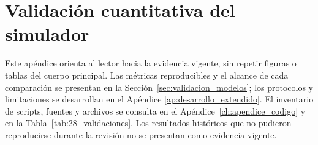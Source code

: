 \chapter{Validaci\'on cuantitativa del simulador}
\label{ap:validacion}

Este ap\'endice orienta al lector hacia la evidencia vigente, sin repetir
figuras o tablas del cuerpo principal. Las m\'etricas reproducibles y el
alcance de cada comparaci\'on se presentan en la Secci\'on~\ref{sec:validacion_modelos};
los protocolos y limitaciones se desarrollan en el Ap\'endice
\ref{ap:desarrollo_extendido}. El inventario de scripts, fuentes y archivos
se consulta en el Ap\'endice~\ref{ch:apendice_codigo} y en la
Tabla~\ref{tab:28_validaciones}. Los resultados hist\'oricos que no pudieron
reproducirse durante la revisi\'on no se presentan como evidencia vigente.





